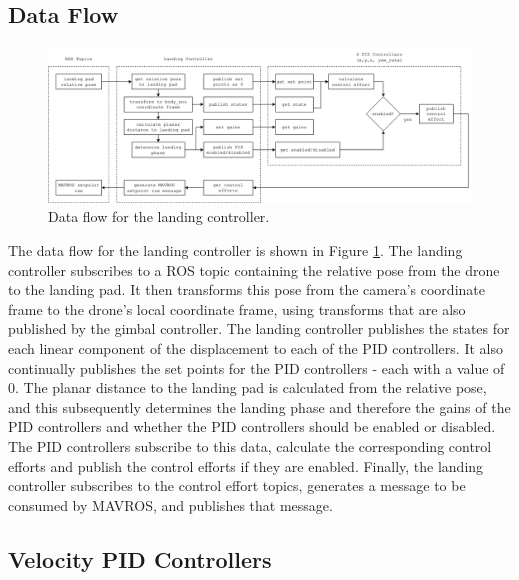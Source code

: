 \subsection{Data Flow}

\begin{figure}[ht]
    \centering
    \includegraphics[width=\textwidth]{images/landing_controller.png}
    \caption{Data flow for the landing controller.}
    \label{fig:landing_controller_data_flow}
\end{figure}

The data flow for the landing controller is shown in Figure \ref{fig:landing_controller_data_flow}. The landing controller subscribes to a ROS topic containing the relative pose from the drone to the landing pad. It then transforms this pose from the camera's coordinate frame to the drone's local coordinate frame, using transforms that are also published by the gimbal controller. The landing controller publishes the states for each linear component of the displacement to each of the PID controllers. It also continually publishes the set points for the PID controllers - each with a value of 0. The planar distance to the landing pad is calculated from the relative pose, and this subsequently determines the landing phase and therefore the gains of the PID controllers and whether the PID controllers should be enabled or disabled. The PID controllers subscribe to this data, calculate the corresponding control efforts and publish the control efforts if they are enabled. Finally, the landing controller subscribes to the control effort topics, generates a message to be consumed by MAVROS, and publishes that message.

\subsection{Velocity PID Controllers}

